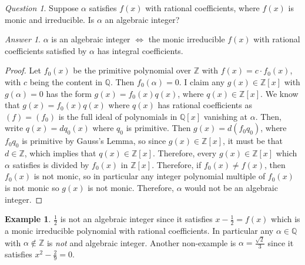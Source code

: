 \documentclass[12pt]{article}
\theoremstyle{definition}
\newtheorem{eg}[thm]{Example}
\theoremstyle{remark}
\newtheorem*{qst}{Question}
\newtheorem*{ans}{Answer}
\numberwithin{equation}{section}
\newcommand\Z{\mathbb Z}    %
\newcommand\Q{\mathbb Q}    %
\begin{document}
\vspace{15pt}

\begin{qst}
        Suppose $\alpha$ satisfies $f(x)$ with rational coefficients, where $f(x)$ is monic and irreducible. Is $\alpha$ an algebraic integer?
\end{qst}
\begin{ans}
        $\alpha$ is an algebraic integer $\iff$ the monic irreducible $f(x)$ with rational coefficients satisfied by $\alpha$ has integral coefficients. 
\end{ans}
\begin{proof}
        Let $f_0(x)$ be the primitive polynomial over $\Z$ with $f(x) = c\cdot f_0(x)$, with $c$ being the content in $\Q$. Then $f_0(\alpha) = 0$. I claim any $g(x) \in \Z[x]$ with $g(\alpha) = 0$ has the form $g(x) = f_0(x)q(x)$, where $q(x) \in \Z[x]$. We know that $g(x) = f_0(x)q(x)$ where $q(x)$ has rational coefficients as $(f) = (f_0)$ is the full ideal of polynomials in $\Q[x]$ vanishing at $\alpha$. Then, write $q(x) = dq_0(x)$ where $q_0$ is primitive. Then $g(x) = d(f_0q_0)$, where $f_0q_0$ is primitive by Gauss's Lemma, so since $g(x) \in \Z[x]$, it must be that $d \in \Z$, which implies that $q(x) \in \Z[x]$. Therefore, every $g(x) \in \Z[x]$ which $\alpha$ satisfies is divided by $f_0(x)$ in $\Z[x]$. Therefore, if $f_0(x) \neq f(x)$, then $f_0(x)$ is not monic, so in particular any integer polynomial multiple of $f_0(x)$ is not monic so $g(x)$ is not monic. Therefore, $\alpha$ would not be an algebraic integer.
\end{proof}



\vspace{15pt}

\begin{eg}
        $\frac{1}{2}$ is not an algebraic integer since it satisfies $x-\frac{1}{2} = f(x)$ which is a monic irreducible polynomial with rational coefficients. In particular any $\alpha \in \Q$ with $\alpha \notin \Z$ is \emph{not} and algebraic integer. Another non-example is $\alpha = \frac{\sqrt{2}}{3}$ since it satisfies $x^2-\frac{2}{9} = 0$.
\end{eg}


\vspace{15pt}
\end{document}
